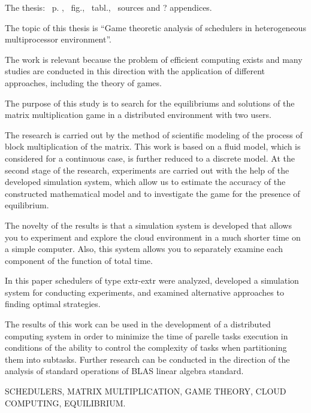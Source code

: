 
The thesis: \pageref*{MyLastPage}~p. , \totfig~fig., \tottab~tabl., ~sources and ? appendices.

The topic of this thesis is ``Game theoretic analysis of schedulers in heterogeneous multiprocessor environment''.

The work is relevant because the problem of efficient computing exists and many studies are conducted in this direction with the application of different approaches, including the theory of games.

The purpose of this study is to search for the equilibriums and solutions of the matrix multiplication game in a distributed environment with two users. 

The research is carried out by the method of scientific modeling of the process of block multiplication of the matrix. This work is based on a fluid model, which is considered for a continuous case, is further reduced to a discrete model. At the second stage of the research, experiments are carried out with the help of the developed simulation system, which allow us to estimate the accuracy of the constructed mathematical model and to investigate the game for the presence of equilibrium.

The novelty of the results is that a simulation system is developed that allows you to experiment and explore the cloud environment in a much shorter time on a simple computer. Also, this system allows you to separately examine each component of the function of total time.

In this paper schedulers of type extr-extr were analyzed, developed a simulation system for conducting experiments, and examined alternative approaches to finding optimal strategies.

The results of this work can be used in the development of a distributed computing system in order to minimize the time of parelle tasks execution in conditions of the ability to control the complexity of tasks when partitioning them into subtasks. Further research can be conducted in the direction of the analysis of standard operations of BLAS linear algebra standard.

\MakeUppercase{schedulers, matrix multiplication, game theory, cloud computing, equilibrium.} 
